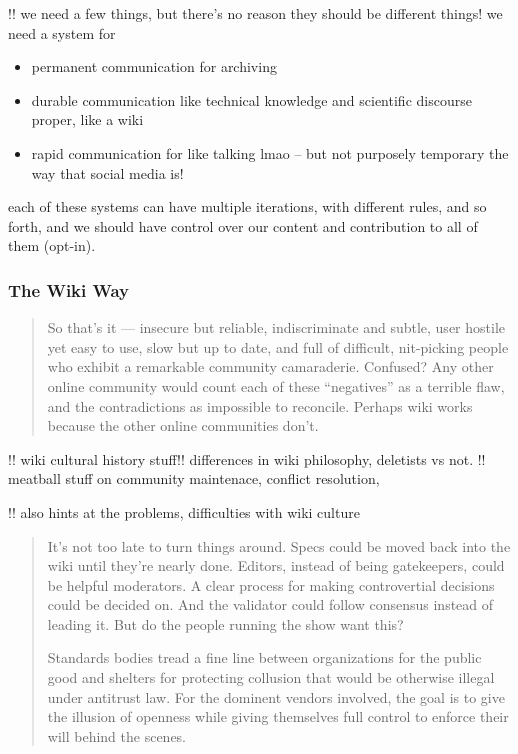 \documentclass[10pt]{article}
\begin{document}
\begin{multicols}{2}
!! we need a few things, but there's no reason they should be different
things! we need a system for

\begin{itemize}

\item
  permanent communication for archiving
\item
  durable communication like technical knowledge and scientific
  discourse proper, like a wiki
\item
  rapid communication for like talking lmao -- but not purposely
  temporary the way that social media is!
\end{itemize}

each of these systems can have multiple iterations, with different
rules, and so forth, and we should have control over our content and
contribution to all of them (opt-in).

\hypertarget{the-wiki-way}{%
\subsubsection{The Wiki Way}\label{the-wiki-way}}

\begin{quote}
So that's it --- insecure but reliable, indiscriminate and subtle, user
hostile yet easy to use, slow but up to date, and full of difficult,
nit-picking people who exhibit a remarkable community camaraderie.
Confused? Any other online community would count each of these
``negatives'' as a terrible flaw, and the contradictions as impossible
to reconcile. Perhaps wiki works because the other online communities
don't. \cite{leufWikiWayQuick2001a, -l, 329} 
\end{quote}

!! wiki cultural history stuff!! differences in wiki philosophy,
deletists vs not. !! meatball stuff on community maintenace, conflict
resolution,

!! also hints at the problems, difficulties with wiki culture

\begin{quote}
It's not too late to turn things around. Specs could be moved back into
the wiki until they're nearly done. Editors, instead of being
gatekeepers, could be helpful moderators. A clear process for making
controvertial decisions could be decided on. And the validator could
follow consensus instead of leading it. But do the people running the
show want this?

Standards bodies tread a fine line between organizations for the public
good and shelters for protecting collusion that would be otherwise
illegal under antitrust law. For the dominent vendors involved, the goal
is to give the illusion of openness while giving themselves full control
to enforce their will behind the scenes.


\end{quote}
\end{multicols}
\end{document}
